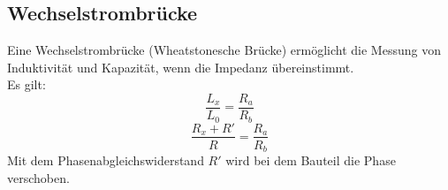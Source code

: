 \subsection{Wechselstrombrücke}
Eine Wechselstrombrücke (Wheatstonesche Brücke) ermöglicht die Messung von Induktivität und Kapazität, wenn die Impedanz übereinstimmt.\\
Es gilt:
\begin{equation}
\frac{L_{x}}{L_{0}}=\frac{R_{a}}{R_{b}}
\end{equation}
\begin{equation}
\frac{R_{x}+R'}{R}=\frac{R_{a}}{R_{b}}
\end{equation}
Mit dem Phasenabgleichswiderstand \(R'\) wird bei dem Bauteil die Phase verschoben.

\newpage